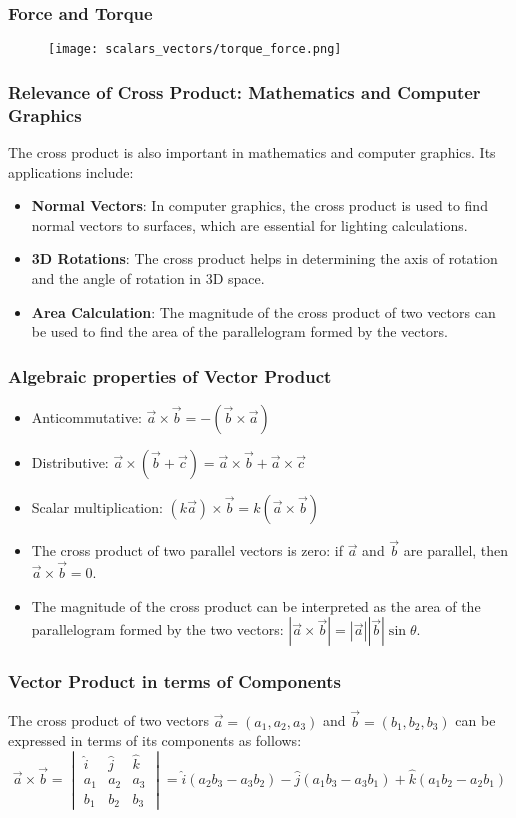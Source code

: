 \begin{frame}
    \frametitle{Force and Torque} 
    \begin{figure}
        \texttt{[image: scalars\_vectors/torque\_force.png]}
    \end{figure}
\end{frame}

\begin{frame}
    \frametitle{Relevance of Cross Product: Mathematics and Computer Graphics}
    The cross product is also important in mathematics and computer graphics. Its applications include:
    \begin{itemize}
        \item \textbf{Normal Vectors}: In computer graphics, the cross product is used to find normal vectors to surfaces, which are essential for lighting calculations.
        \item \textbf{3D Rotations}: The cross product helps in determining the axis of rotation and the angle of rotation in 3D space.
        \item \textbf{Area Calculation}: The magnitude of the cross product of two vectors can be used to find the area of the parallelogram formed by the vectors.
    \end{itemize}
\end{frame}

\begin{frame}
    \frametitle{Algebraic properties of Vector Product}
    \begin{itemize}
        \item Anticommutative: \(\vec{a} \times \vec{b} = -(\vec{b} \times \vec{a})\)
        \item Distributive: \(\vec{a} \times (\vec{b} + \vec{c}) = \vec{a} \times \vec{b} + \vec{a} \times \vec{c}\)
        \item Scalar multiplication: \((k \vec{a}) \times \vec{b} = k (\vec{a} \times \vec{b})\)
        \item The cross product of two parallel vectors is zero: if \(\vec{a}\) and \(\vec{b}\) are parallel, then \(\vec{a} \times \vec{b} = 0\).
        \item The magnitude of the cross product can be interpreted as the area of the parallelogram formed by the two vectors: \(|\vec{a} \times \vec{b}| = |\vec{a}| |\vec{b}| \sin \theta\).
    \end{itemize}
\end{frame}

\begin{frame}
\frametitle{Vector Product in terms of Components}
The cross product of two vectors \(\vec{a} = (a_1, a_2, a_3)\) and \(\vec{b} = (b_1, b_2, b_3)\) can be expressed in terms of its components as follows:
\[
\vec{a} \times \vec{b} = \begin{vmatrix}
\hat{i} & \hat{j} & \hat{k} \\
a_1 & a_2 & a_3 \\
b_1 & b_2 & b_3
\end{vmatrix}
= \hat{i}(a_2b_3 - a_3b_2) - \hat{j}(a_1b_3 - a_3b_1) + \hat{k}(a_1b_2 - a_2b_1)
\]
\end{frame}

